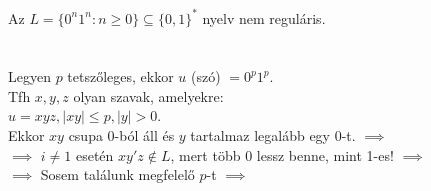 \begin{frame}
\begin{tcolorbox}[title={Tétel: Példa nemreguláris nyelvre}]
Az $L = \{0^n1^n : n \geq 0\} \subseteq \{0, 1\}^*$ nyelv nem reguláris.\\
\tcblower
\msmallskip
\underline{}\\
\mmedskip
\\
Legyen $p$  tetszőleges, ekkor $u$ (szó) $ = 0^p1^p$.\\
Tfh $x, y, z$ olyan szavak, amelyekre:\\
$u = xyz, |xy| \leq p, |y| > 0$.\\
\mbigskip
Ekkor $xy$ csupa 0-ból áll és $y$ tartalmaz legalább egy 0-t. $\implies$\\
$\implies$ $i \neq 1$ esetén $xy'z \notin L$, mert több 0 lessz benne, mint 1-es! $\implies$\\
$\implies$ Sosem találunk megfelelő $p$-t $\implies$ \\
\end{tcolorbox}

\end{frame}

